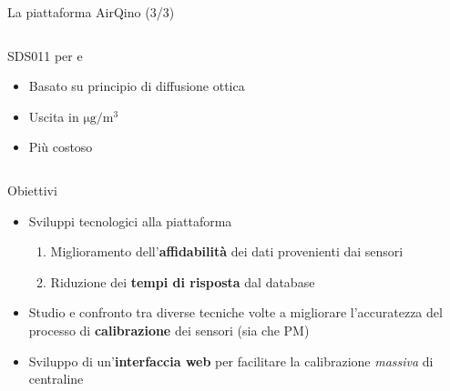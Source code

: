 \begin{frame}[t]{La piattaforma AirQino (3/3)}
\begin{columns}
\begin{column}{0.5\textwidth}
\begin{center}
\begin{block}{SDS011 per  e }
\begin{figure}[H]
    \centering
\end{figure}
\vspace{0.1cm}
\begin{itemize}
  \item Basato su principio di diffusione ottica
  \item Uscita in $\mathrm{\si{\micro}g/m^3}$
  \item Più costoso
\end{itemize}
\vspace{0.2cm}

\end{block}
\end{center}
\end{column}

\end{columns}
\end{frame}

\begin{frame}{Obiettivi}
\begin{itemize}
  \item Sviluppi tecnologici alla piattaforma
  \begin{enumerate}
    \item Miglioramento dell'\textbf{affidabilità} dei dati provenienti dai sensori
    \item Riduzione dei \textbf{tempi di risposta} dal database
  \end{enumerate}\vspace{0.3cm}
  \item Studio e confronto tra diverse tecniche volte a migliorare l’accuratezza del processo di \textbf{calibrazione} dei sensori (sia  che PM)\vspace{0.3cm}
  \item Sviluppo di un’\textbf{interfaccia web} per facilitare la calibrazione \textit{massiva} di centraline
\end{itemize}
\end{frame}


